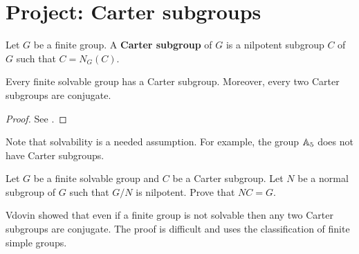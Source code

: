 
\section{Project: Carter subgroups}

\begin{definition}
    Let $G$ be a finite group. A \textbf{Carter subgroup} of $G$ 
    is a nilpotent subgroup $C$ of $G$ such that 
    $C=N_G(C)$. 
\end{definition}

\begin{theorem}[Carter]
    \label{thm:Carter}
    Every finite solvable group has a Carter subgroup. Moreover, 
    every two Carter subgroups are conjugate. 
\end{theorem}

\begin{proof}
    See \cite{MR0123603}. 
\end{proof}

Note that solvability is a needed assumption. For example, the
group $\mathbb{A}_5$ does not have Carter subgroups. 

\begin{exercise}
    Let $G$ be a finite solvable group and $C$ be a Carter subgroup. Let $N$ be a normal
    subgroup of $G$ such that $G/N$ is nilpotent. Prove that $NC=G$. 
\end{exercise}

Vdovin showed that even 
if a finite group is not solvable then any two Carter subgroups are conjugate. The proof is difficult and uses the classification of finite simple groups. 
